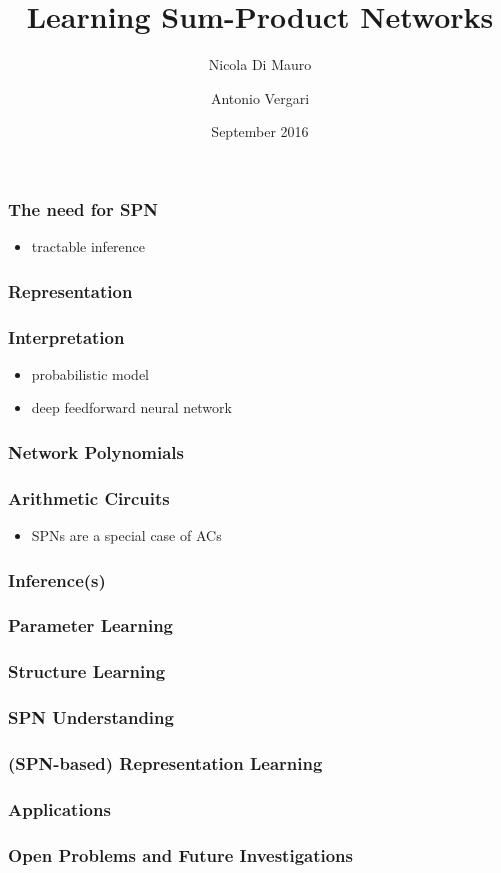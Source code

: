 \documentclass{beamer}
\title{Learning Sum-Product Networks}
\author{Nicola Di Mauro \and Antonio Vergari}
\date{September 2016}
\begin{document}
\begin{frame}
\maketitle
\end{frame}

\begin{frame}
\frametitle{The need for SPN}
\begin{itemize}
\item tractable inference
\end{itemize}
\end{frame}

\begin{frame}
\frametitle{Representation}
\end{frame}

\begin{frame}
\frametitle{Interpretation}
\begin{itemize}
\item probabilistic model
\item deep feedforward neural network
\end{itemize}
\end{frame}

\begin{frame}
\frametitle{Network Polynomials}
\end{frame}

\begin{frame}
\frametitle{Arithmetic Circuits}
\begin{itemize}
\item SPNs are a special case of ACs
\end{itemize}
\end{frame}

\begin{frame}
\frametitle{Inference(s)}
\end{frame}

\begin{frame}
\frametitle{Parameter Learning}
\end{frame}

\begin{frame}
\frametitle{Structure Learning}
\end{frame}

\begin{frame}
\frametitle{SPN Understanding}
\end{frame}

\begin{frame}
\frametitle{(SPN-based) Representation Learning}
\end{frame}


\begin{frame}
\frametitle{Applications}
\end{frame}

\begin{frame}
\frametitle{Open Problems and Future Investigations}
\end{frame}
\end{document}
